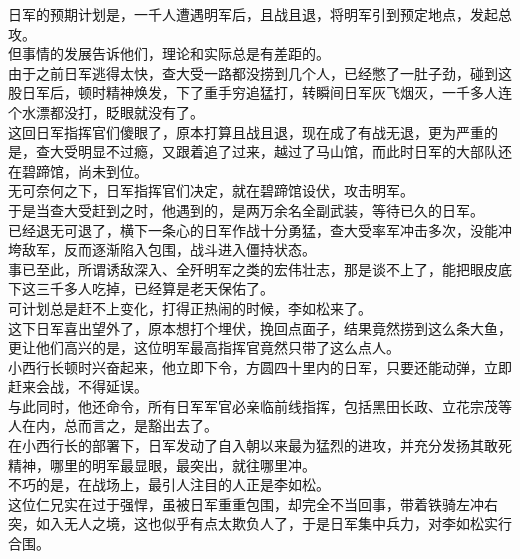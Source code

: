 \begin{multicols}{\theparacolNo}
日军的预期计划是，一千人遭遇明军后，且战且退，将明军引到预定地点，发起总攻。\\

但事情的发展告诉他们，理论和实际总是有差距的。\\

由于之前日军逃得太快，查大受一路都没捞到几个人，已经憋了一肚子劲，碰到这股日军后，顿时精神焕发，下了重手穷追猛打，转瞬间日军灰飞烟灭，一千多人连个水漂都没打，眨眼就没有了。\\

这回日军指挥官们傻眼了，原本打算且战且退，现在成了有战无退，更为严重的是，查大受明显不过瘾，又跟着追了过来，越过了马山馆，而此时日军的大部队还在碧蹄馆，尚未到位。\\

无可奈何之下，日军指挥官们决定，就在碧蹄馆设伏，攻击明军。\\

于是当查大受赶到之时，他遇到的，是两万余名全副武装，等待已久的日军。\\

已经退无可退了，横下一条心的日军作战十分勇猛，查大受率军冲击多次，没能冲垮敌军，反而逐渐陷入包围，战斗进入僵持状态。\\

事已至此，所谓诱敌深入、全歼明军之类的宏伟壮志，那是谈不上了，能把眼皮底下这三千多人吃掉，已经算是老天保佑了。\\

可计划总是赶不上变化，打得正热闹的时候，李如松来了。\\

这下日军喜出望外了，原本想打个埋伏，挽回点面子，结果竟然捞到这么条大鱼，更让他们高兴的是，这位明军最高指挥官竟然只带了这么点人。\\

小西行长顿时兴奋起来，他立即下令，方圆四十里内的日军，只要还能动弹，立即赶来会战，不得延误。\\

与此同时，他还命令，所有日军军官必亲临前线指挥，包括黑田长政、立花宗茂等人在内，总而言之，是豁出去了。\\

在小西行长的部署下，日军发动了自入朝以来最为猛烈的进攻，并充分发扬其敢死精神，哪里的明军最显眼，最突出，就往哪里冲。\\

不巧的是，在战场上，最引人注目的人正是李如松。\\

这位仁兄实在过于强悍，虽被日军重重包围，却完全不当回事，带着铁骑左冲右突，如入无人之境，这也似乎有点太欺负人了，于是日军集中兵力，对李如松实行合围。\\


\end{multicols}
